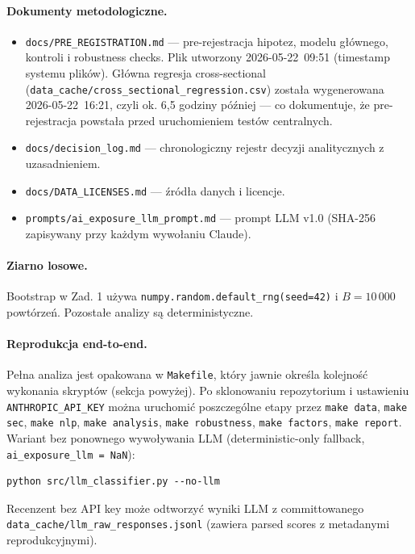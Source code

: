 \documentclass[11pt,a4paper]{article}
\begin{document}
\paragraph{Dokumenty metodologiczne.}
\begin{itemize}
  \item \texttt{docs/PRE\_REGISTRATION.md} --- pre-rejestracja hipotez,
        modelu głównego, kontroli i robustness checks. Plik utworzony
        \mbox{2026-05-22 09:51} (timestamp systemu plików). Główna regresja
        cross-sectional (\texttt{data\_cache/cross\_sectional\_regression.csv})
        została wygenerowana \mbox{2026-05-22 16:21}, czyli ok. 6{,}5 godziny
        później --- co dokumentuje, że pre-rejestracja powstała przed
        uruchomieniem testów centralnych.
  \item \texttt{docs/decision\_log.md} --- chronologiczny rejestr decyzji
        analitycznych z uzasadnieniem.
  \item \texttt{docs/DATA\_LICENSES.md} --- źródła danych i licencje.
  \item \texttt{prompts/ai\_exposure\_llm\_prompt.md} --- prompt LLM v1.0
        (SHA-256 zapisywany przy każdym wywołaniu Claude).
\end{itemize}

\paragraph{Ziarno losowe.} Bootstrap w Zad. 1 używa \texttt{numpy.random.default\_rng(seed=42)}
i $B = 10\,000$ powtórzeń. Pozostałe analizy są deterministyczne.

\paragraph{Reprodukcja end-to-end.}
Pełna analiza jest opakowana w \texttt{Makefile}, który jawnie określa
kolejność wykonania skryptów (sekcja powyżej). Po sklonowaniu repozytorium
i ustawieniu \texttt{ANTHROPIC\_API\_KEY} można uruchomić poszczególne etapy
przez \texttt{make data}, \texttt{make sec}, \texttt{make nlp},
\texttt{make analysis}, \texttt{make robustness}, \texttt{make factors},
\texttt{make report}. Wariant bez ponownego wywoływania LLM
(deterministic-only fallback, \texttt{ai\_exposure\_llm = NaN}):
\begin{verbatim}
python src/llm_classifier.py --no-llm
\end{verbatim}
Recenzent bez API key może odtworzyć wyniki LLM z committowanego
\texttt{data\_cache/llm\_raw\_responses.jsonl} (zawiera parsed scores
z metadanymi reprodukcyjnymi).
\end{document}
